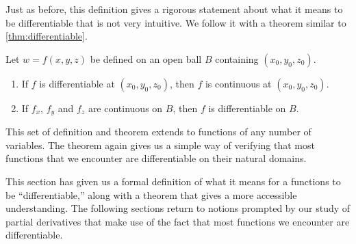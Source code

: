 Just as before, this definition gives a rigorous statement about what it means to be differentiable that is not very intuitive. We follow it with a theorem similar to \autoref{thm:differentiable}.

{Let $w=f(x,y,z)$ be defined on an open ball $B$ containing $(x_0,y_0,z_0)$. 
\begin{enumerate}
\item	If $f$ is differentiable at $(x_0,y_0,z_0)$, then $f$ is continuous at $(x_0,y_0,z_0)$.
\item If $f_x$, $f_y$  and $f_z$ are continuous on $B$, then $f$ is differentiable on $B$.
\end{enumerate}}

This set of definition and theorem extends to functions of any number of variables. The theorem again gives us a simple way of verifying that most functions that we encounter are differentiable on their natural domains.\bigskip

This section has given us a formal definition of what it means for a functions to be ``differentiable,'' along with a theorem that gives a more accessible understanding. The following sections return to notions prompted by our study of partial derivatives that make use of the fact that most functions we encounter are differentiable.

